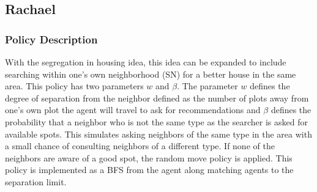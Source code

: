 \documentclass[11pt]{article}
\begin{document}
	\subsection{Rachael}
	\subsubsection{Policy Description}
	With the segregation in housing idea, this idea can be expanded to include searching within one's own neighborhood (SN) for a better house in the same area. This policy has two parameters $w$ and $\beta$. The parameter $w$ defines the degree of separation from the neighbor defined as the number of plots away from one's own plot the agent will travel to ask for recommendations and $\beta$ defines the probability that a neighbor who is not the same type as the searcher is asked for available spots. This simulates asking neighbors of the same type in the area with a small chance of consulting neighbors of a different type. If none of the neighbors are aware of a good spot, the random move policy is applied. This policy is implemented as a BFS from the agent along matching agents to the separation limit.
	
\end{document}
